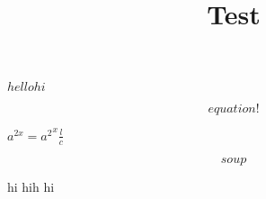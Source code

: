 \documentclass{article}
\title{
  Test
}
\begin{document}
\maketitle


\section{}

\(hello hi\)

\[
  equation!
\]

\(a^{2x} = {a^2}^x \frac{l}{c}\)

\begin{equation}
\label{eq:2}
  soup
\end{equation}

hi hih hi
\end{document}
